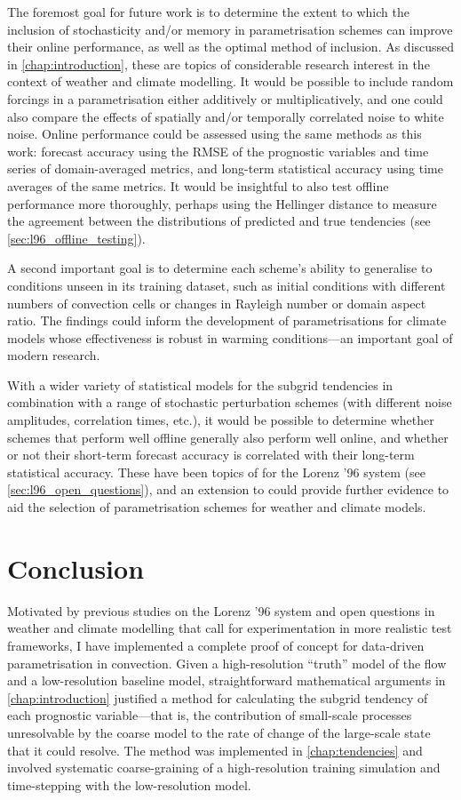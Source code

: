 \documentclass[../main.tex]{subfiles}
\begin{document}
The foremost goal for future work is to determine the extent to which the
inclusion of stochasticity and/or memory in parametrisation schemes can improve
their online performance, as well as the optimal method of inclusion. As
discussed in \cref{chap:introduction}, these are topics of considerable
research interest in the context of weather and climate modelling. It would be
possible to include random forcings in a parametrisation either additively or
multiplicatively, and one could also compare the effects of spatially and/or
temporally correlated noise to white noise. Online performance could be
assessed using the same methods as this work: forecast accuracy using the RMSE
of the prognostic variables and time series of domain-averaged metrics, and
long-term statistical accuracy using time averages of the same metrics. It
would be insightful to also test offline performance more thoroughly, perhaps
using the Hellinger distance to measure the agreement between the distributions
of predicted and true tendencies (see \cref{sec:l96_offline_testing}).

A second important goal is to determine each scheme's ability to generalise to
conditions unseen in its training dataset, such as initial conditions with
different numbers of convection cells or changes in Rayleigh number or domain
aspect ratio. The findings could inform the development of parametrisations
for climate models whose effectiveness is robust in warming conditions---an
important goal of modern research.

With a wider variety of statistical models for the subgrid tendencies in
combination with a range of stochastic perturbation schemes (with different
noise amplitudes, correlation times, etc.), it would be possible to determine
whether schemes that perform well offline generally also perform well online,
and whether or not their short-term forecast accuracy is correlated with their
long-term statistical accuracy. These have been topics of for the Lorenz '96
system (see \cref{sec:l96_open_questions}), and an extension to \rb{} could
provide further evidence to aid the selection of parametrisation schemes for
weather and climate models.


\section{Conclusion}
\label{sec:conclusion}
Motivated by previous studies on the Lorenz '96 system and open questions in
weather and climate modelling that call for experimentation in more realistic
test frameworks, I have implemented a complete proof of concept for data-driven
parametrisation in \rb{} convection. Given a high-resolution ``truth'' model of
the flow and a low-resolution baseline model, straightforward mathematical
arguments in \cref{chap:introduction} justified a method for calculating the
subgrid tendency of each prognostic variable---that is, the contribution of
small-scale processes unresolvable by the coarse model to the rate of change of
the large-scale state that it could resolve. The method was implemented in
\cref{chap:tendencies} and involved systematic coarse-graining of a
high-resolution training simulation and time-stepping with the low-resolution
model.
\end{document}

